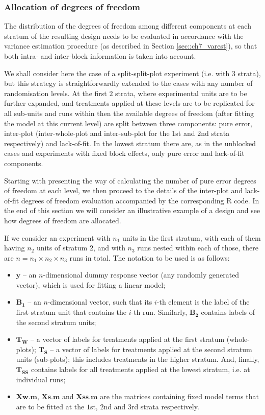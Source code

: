 \subsubsection{Allocation of degrees of freedom}

The distribution of the degrees of freedom among different components at each stratum of the resulting design needs to be evaluated in accordance with the variance estimation procedure (as described in Section \ref{sec::ch7_varest}), so that both intra- and inter-block information is taken into account. 

We shall consider here the case of a split-split-plot experiment (i.e. with $3$ strata), but this strategy is straightforwardly extended to the cases with any number of randomisation levels. At the first $2$ strata, where experimental units are to be further expanded, and treatments applied at these levels are to be replicated for all sub-units and runs within then the available degrees of freedom (after fitting the model at this current level) are split between three components: pure error, inter-plot (inter-whole-plot and inter-sub-plot for the $1$st and $2$nd strata respectively) and lack-of-fit. In the lowest stratum there are, as in the unblocked cases and experiments with fixed block effects, only pure error and lack-of-fit components.

Starting with presenting the way of calculating the number of pure error degrees of freedom at each level, we then proceed to the details of the inter-plot and lack-of-fit degrees of freedom evaluation accompanied by the corresponding R code. In the end of this section we will consider an illustrative example of a design and see how degrees of freedom are allocated.

If we consider an experiment with $n_1$ units in the first stratum, with each of them having $n_2$ units of stratum $2$, and with $n_3$ runs nested within each of those, there are $n=n_1\times n_2\times n_3$ runs in total. The notation to be used is as follows:
\begin{itemize}
\item $\bm{y}$ -- an $n$-dimensional dummy response vector (any randomly generated vector), which is used for fitting a linear model;
\item $\bm{B_1}$ -- an $n$-dimensional vector, such that its $i$-th element is the label of the first stratum unit that contains the $i$-th run. Similarly, $\bm{B_2}$ contains labels of the second stratum units;
\item  $\bm{T_{W}}$ -- a vector of labels for treatments applied at the first stratum (whole-plots); $\bm{T_{S}}$ -- a vector of labels for treatments applied at the second stratum units (sub-plots); this includes treatments in the higher stratum. And, finally, $\bm{T_{SS}}$ contains labels for all treatments applied at the lowest stratum, i.e. at individual runs;
\item $\bm{Xw.m}$, $\bm{Xs.m}$ and $\bm{Xss.m}$ are the matrices containing fixed model terms that are to be fitted at the $1$st, $2$nd and $3$rd strata respectively.
\end{itemize}

